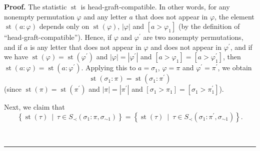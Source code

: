 \documentclass[numbers=enddot,12pt,final,onecolumn,notitlepage]{scrartcl}%
\theoremstyle{definition}
\newenvironment{proof}[1][Proof]{\noindent\textbf{#1.} }{\ \rule{0.5em}{0.5em}}
\begin{document}
\begin{proof}
The statistic $\operatorname*{st}$ is head-graft-compatible. In other words,
for any nonempty permutation $\varphi$ and any letter $a$ that does not appear
in $\varphi$, the element $\operatorname*{st}\left(  a:\varphi\right)  $
depends only on $\operatorname*{st}\left(  \varphi\right)  $, $\left\vert
\varphi\right\vert $ and $\left[  a>\varphi_{1}\right]  $ (by the definition
of \textquotedblleft head-graft-compatible\textquotedblright). Hence,
if $\varphi$ and $\varphi^{\prime}$ are two nonempty permutations, and if $a$
is any letter that does not appear in $\varphi$ and does not appear in
$\varphi^{\prime}$, and if we have $\operatorname*{st}\left(  \varphi\right)
=\operatorname*{st}\left(  \varphi^{\prime}\right)  $ and $\left\vert
\varphi\right\vert =\left\vert \varphi^{\prime}\right\vert $ and $\left[
a>\varphi_{1}\right]  =\left[  a>\varphi_{1}^{\prime}\right]  $, then
$\operatorname*{st}\left(  a:\varphi\right)  =\operatorname*{st}\left(
a:\varphi^{\prime}\right)  $. Applying this to $a=\sigma_{1}$, $\varphi=\pi$
and $\varphi^{\prime}=\pi^{\prime}$, we obtain
\[
\operatorname*{st}\left(  \sigma_{1}:\pi\right)  =\operatorname*{st}\left(
\sigma_{1}:\pi^{\prime}\right)
\]
(since $\operatorname*{st}\left(  \pi\right)  =\operatorname*{st}\left(
\pi^{\prime}\right)  $ and $\left\vert \pi\right\vert =\left\vert \pi^{\prime
}\right\vert $ and $\left[  \sigma_{1}>\pi_{1}\right]  =\left[  \sigma_{1}%
>\pi_{1}^{\prime}\right]  $).

Next, we claim that%
\begin{equation}
\left\{  \operatorname*{st}\left(  \tau\right)  \ \mid\ \tau\in S_{\prec
}\left(  \sigma_{1}:\pi,\sigma_{\sim1}\right)  \right\}  =\left\{
\operatorname*{st}\left(  \tau\right)  \ \mid\ \tau\in S_{\prec}\left(
\sigma_{1}:\pi^{\prime},\sigma_{\sim1}\right)  \right\}  .
\label{pf.thm.head-comp.LRcomp.c1.pf.5}%
\end{equation}



\end{proof}
\end{document}

